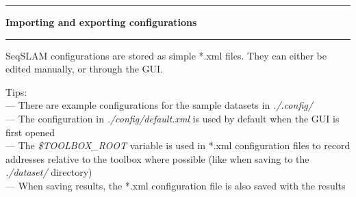 \noindent\rule{\textwidth}{1pt}
\indent \textbf{Importing and exporting configurations}
\noindent\rule{\textwidth}{1pt}
\smallskip
\parbox{\textwidth}{SeqSLAM configurations are stored as simple *.xml files. They can either be edited manually, or through the GUI.}
\bigskip
\parbox{\textwidth}{Tips: \\ --- There are example configurations for the sample datasets in \textit{./.config/} \\ --- The configuration in \textit{./config/default.xml} is used by default when the GUI is first opened \\ --- The \textit{\$TOOLBOX\_ROOT} variable is used in *.xml configuration files to record addresses relative to the toolbox where possible (like when saving to the \textit{./dataset/} directory) \\ --- When saving results, the *.xml configuration file is also saved with the results}
\smallskip

